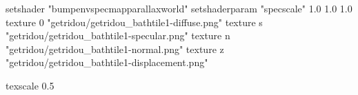 setshader "bumpenvspecmapparallaxworld"
setshaderparam "specscale" 1.0 1.0 1.0
texture 0 "getridou/getridou_bathtile1-diffuse.png"
texture s "getridou/getridou_bathtile1-specular.png"
texture n "getridou/getridou_bathtile1-normal.png"
texture z "getridou/getridou_bathtile1-displacement.png"

texscale 0.5

